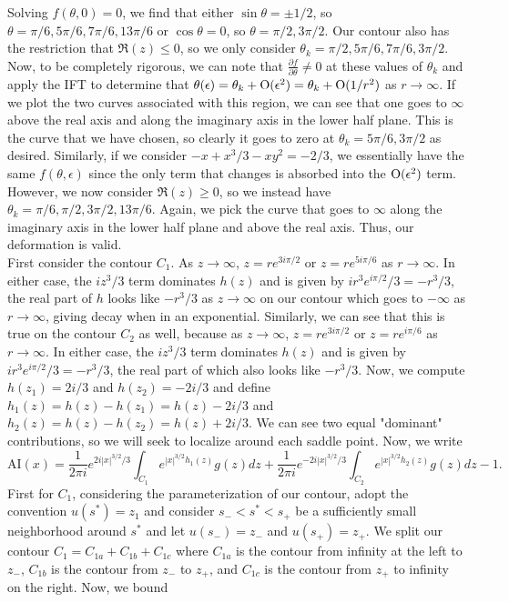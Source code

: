 \documentclass{article}
\begin{document}
Solving $f(\theta,0)=0$, we find that either $\sin\theta=\pm1/2$, so $\theta=\pi/6,5\pi/6,7\pi/6,13\pi/6$ or $\cos\theta=0$, so $\theta=\pi/2,3\pi/2$. Our contour also has the restriction that $\Re(z)\leq0$, so we only consider $\theta_k=\pi/2,5\pi/6,7\pi/6,3\pi/2$. Now, to be completely rigorous, we can note that $\frac{\partial f}{\partial\theta}\neq0$ at these values of $\theta_k$ and apply the IFT to determine that $\theta(\epsilon)=\theta_k +\operatorname{O}(\epsilon^2)=\theta_k+\operatorname{O}(1/r^2)$ as $r\to\infty$. If we plot the two curves associated with this region, we can see that one goes to $\infty$ above the real axis and along the imaginary axis in the lower half plane. This is the curve that we have chosen, so clearly it goes to zero at $\theta_k=5\pi/6,3\pi/2$ as desired. Similarly, if we consider $-x+x^3/3-xy^2=-2/3$, we essentially have the same $f(\theta,\epsilon)$ since the only term that changes is absorbed into the $\operatorname{O}(\epsilon^2)$ term. However, we now consider $\Re(z)\geq0$, so we instead have $\theta_k=\pi/6,\pi/2,3\pi/2,13\pi/6$. Again, we pick the curve that goes to $\infty$ along the imaginary axis in the lower half plane and above the real axis. Thus, our deformation is valid. \\
First consider the contour $C_1$. As $z\to\infty$, $z=re^{3i\pi/2}$ or $z=re^{5i\pi/6}$ as $r\to\infty$. In either case, the $iz^3/3$ term dominates $h(z)$ and is given by $ir^3e^{i\pi/2}/3=-r^3/3$, the real part of $h$ looks like $-r^3/3$ as $z\to\infty$ on our contour which goes to $-\infty$ as $r\to\infty$, giving decay when in an exponential. Similarly, we can see that this is true on the contour $C_2$ as well, because as $z\to\infty$, $z=re^{3i\pi/2}$ or $z=re^{i\pi/6}$ as $r\to\infty$. In either case, the $iz^3/3$ term dominates $h(z)$ and is given by $ir^3e^{i\pi/2}/3=-r^3/3$, the real part of which also looks like $-r^3/3$. Now, we compute $h(z_1)=2i/3$ and $h(z_2)=-2i/3$ and define $h_1(z)=h(z)-h(z_1)=h(z)-2i/3$ and $h_2(z)=h(z)-h(z_2)=h(z)+2i/3$. We can see two equal "dominant" contributions, so we will seek to localize around each saddle point. Now, we write
\[
\mathrm{AI}(x)=\frac{1}{2 \pi i} e^{2i|x|^{3/2}/3}\int_{C_1} e^{|x|^{3/2}h_1(z)}g(z)dz+\frac{1}{2 \pi i} e^{-2i|x|^{3/2}/3}\int_{C_2} e^{|x|^{3/2}h_2(z)}g(z)dz-1.
\]
First for $C_1$, considering the parameterization of our contour, adopt the convention $u(s^*)=z_1$ and consider $s_-<s^*<s_+$ be a sufficiently small neighborhood around $s^*$ and let $u(s_-)=z_-$ and $u(s_+)=z_+$. We split our contour $C_1=C_{1a}+C_{1b}+C_{1c}$ where $C_{1a}$ is the contour from infinity at the left to $z_-$, $C_{1b}$ is the contour from $z_-$ to $z_+$, and $C_{1c}$ is the contour from $z_+$ to infinity on the right. Now, we bound
\end{document}
